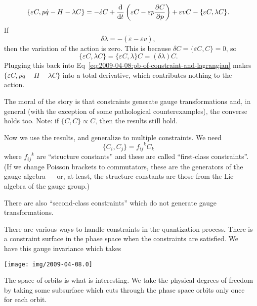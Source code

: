 \begin{equation}\label{eq:2009-04-08:pb-of-constraint-and-lagrangian}
  \{\varepsilon C, p\dot{q}-H-\lambda C\}
  = -\dot{\varepsilon}C + \frac{\mathrm{d}}{\mathrm{d} t}\left(\varepsilon C - \varepsilon p\frac{\partial C}{\partial p}\right)
+\varepsilon vC-\{\varepsilon C,\lambda C\}.
\end{equation}
If
\begin{equation}
\delta\lambda = -(\dot{\varepsilon}-\varepsilon v),
\end{equation}
then the variation of the action is zero. This is because $\delta C
=\{\varepsilon C,C\} = 0$, so
\begin{equation}
\{\varepsilon C,\lambda C\} = \{\varepsilon C,\lambda\}C = (\delta\lambda)C.
\end{equation}
Plugging this back into
Eq~\eqref{eq:2009-04-08:pb-of-constraint-and-lagrangian} makes
$\{\varepsilon C, p\dot{q}-H-\lambda C\}$ into a total derivative, which
contributes nothing to the action.

The moral of the story is that constraints generate gauge
transformations and, in general (with the exception of some pathological
counterexamples), the converse holds too. Note: if $\{C,C\}\propto C$,
then the results still hold.

Now we use the results, and generalize to multiple constraints. We need
\begin{equation}
\{C_{i},C_{j}\} = {f_{ij}}^{k}C_{k}
\end{equation}
where ${f_{ij}}^{k}$ are ``structure constants'' and these are called
``first-class constraints''. (If we change Poisson brackets to
commutators, these are the generators of the gauge algebra --- or, at
least, the structure constants are those from the Lie algebra of the
gauge group.)

There are also ``second-class constraints'' which do not generate gauge
transformations.

There are various ways to handle constraints in the quantization
process. There is a constraint surface in the phase space when the
constraints are satisfied. We have this gauge invariance which
takes 
\begin{center}
\texttt{[image: img/2009-04-08.0]}
\end{center}
The space of orbits is what is interesting. We take the physical degrees
of freedom by taking some subsurface which cuts through the phase space
orbits only once for each orbit.

